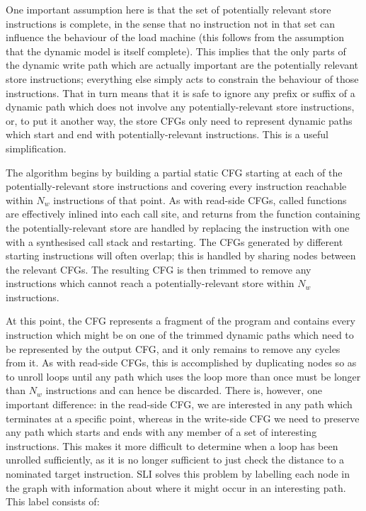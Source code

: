 One important assumption here is that the set of potentially relevant store instructions is complete, in the sense that no instruction not in that set can influence the behaviour of the load machine (this follows from the assumption that the dynamic model is itself complete).
This implies that the only parts of the dynamic write path which are actually important are the potentially relevant store instructions; everything else simply acts to constrain the behaviour of those instructions.
That in turn means that it is safe to ignore any prefix or suffix of a dynamic path which does not involve any potentially-relevant store instructions, or, to put it another way, the store CFGs only need to represent dynamic paths which start and end with potentially-relevant instructions.
This is a useful simplification.

The algorithm begins by building a partial static CFG starting at each of the potentially-relevant store instructions and covering every instruction reachable within $N_w$ instructions of that point.
As with read-side CFGs, called functions are effectively inlined into each call site, and returns from the function containing the potentially-relevant store are handled by replacing the instruction with one with a synthesised call stack and restarting.
The CFGs generated by different starting instructions will often overlap; this is handled by sharing nodes between the relevant CFGs.
The resulting CFG is then trimmed to remove any instructions which cannot reach a potentially-relevant store within $N_w$ instructions.

At this point, the CFG represents a fragment of the program and contains every instruction which might be on one of the trimmed dynamic paths which need to be represented by the output CFG, and it only remains to remove any cycles from it.
As with read-side CFGs, this is accomplished by duplicating nodes so as to unroll loops until any path which uses the loop more than once must be longer than $N_w$ instructions and can hence be discarded.
There is, however, one important difference: in the read-side CFG, we are interested in any path which terminates at a specific point, whereas in the write-side CFG we need to preserve any path which starts and ends with any member of a set of interesting instructions.
This makes it more difficult to determine when a loop has been unrolled sufficiently, as it is no longer sufficient to just check the distance to a nominated target instruction.
SLI solves this problem by labelling each node in the graph with information about where it might occur in an interesting path.
This label consists of:

